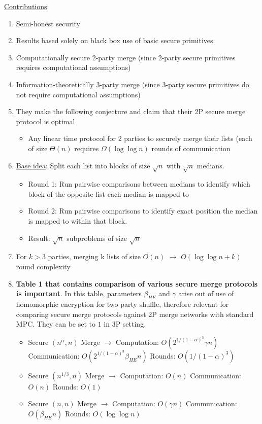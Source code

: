 \underline{Contributions}:
\begin{enumerate}
    \item Semi-honest security
    \item Results based solely on black box use of basic secure primitives.
    \item Computationally secure 2-party merge (since 2-party secure primitives requires computational assumptions)
    \item Information-theoretically 3-party merge (since 3-party secure primitives do not require computational assumptions)
    \item They make the following conjecture and claim that their 2P secure merge protocol is optimal
    \begin{itemize}
        \item Any linear time protocol for 2 parties to securely merge their lists (each of size $\Theta (n)$ requires $\Omega (\log \log n)$ rounds of communication
    \end{itemize}
    \item \underline{Base idea}: Split each list into blocks of size $\sqrt n$ with $\sqrt n$ medians.
    \begin{itemize}
        \item Round 1: Run pairwise comparisons between medians to identify which block of the opposite list each median is mapped to
        \item Round 2: Run pairwise comparisons to identify exact position the median is mapped to within that block.
        \item Result: $\sqrt n$ subproblems of size $\sqrt n$
    \end{itemize}
    \item For $k > 3$ parties, merging k lists of size $O(n)$ $\rightarrow$ $O(\log \log n + k)$ round complexity
    \item \textbf{Table 1 that contains comparison of various secure merge protocols is important}. In this table, parameters $\beta_{HE}$ and $\gamma$ arise out of use of homomorphic encryption for two party shuffle, therefore relevant for comparing secure merge protocols against 2P merge networks with standard MPC. They can be set to $1$ in 3P setting.
    \begin{itemize}
        \item Secure $(n^\alpha , n)$ Merge $\rightarrow$ Computation: $O(2^{1/(1-\alpha)^3} \gamma n)$ Communication: $O(2^{1/(1-\alpha)^3} \beta_{HE} n)$ Rounds: $O(1/(1-\alpha)^3)$
        \item Secure $(n^{1/3} , n)$ Merge $\rightarrow$ Computation: $O(n)$ Communication: $O(n)$ Rounds: $O(1)$
        \item Secure $(n , n)$ Merge $\rightarrow$ Computation: $O(\gamma n)$ Communication: $O(\beta_{HE} n)$ Rounds: $O(\log \log n)$


\end{itemize}
\end{enumerate}
